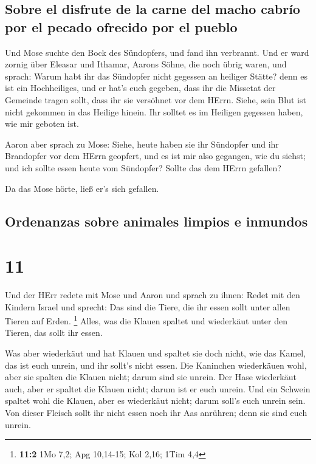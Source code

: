 \hypertarget{sobre-el-disfrute-de-la-carne-del-macho-cabruxedo-por-el-pecado-ofrecido-por-el-pueblo}{%
\subsection{Sobre el disfrute de la carne del macho cabrío por el pecado
ofrecido por el
pueblo}\label{sobre-el-disfrute-de-la-carne-del-macho-cabruxedo-por-el-pecado-ofrecido-por-el-pueblo}}

 Und Mose suchte den Bock des Sündopfers, und fand ihn
verbrannt. Und er ward zornig über Eleasar und Ithamar, Aarons Söhne,
die noch übrig waren, und sprach:  Warum habt ihr das
Sündopfer nicht gegessen an heiliger Stätte? denn es ist ein
Hochheiliges, und er hat's euch gegeben, dass ihr die Missetat der
Gemeinde tragen sollt, dass ihr sie versöhnet vor dem HErrn.
 Siehe, sein Blut ist nicht gekommen in das Heilige
hinein. Ihr solltet es im Heiligen gegessen haben, wie mir geboten ist.

 Aaron aber sprach zu Mose: Siehe, heute haben sie ihr
Sündopfer und ihr Brandopfer vor dem HErrn geopfert, und es ist mir also
gegangen, wie du siehst; und ich sollte essen heute vom Sündopfer?
Sollte das dem HErrn gefallen?

 Da das Mose hörte, ließ er's sich gefallen.

\hypertarget{ordenanzas-sobre-animales-limpios-e-inmundos}{%
\subsection{Ordenanzas sobre animales limpios e
inmundos}\label{ordenanzas-sobre-animales-limpios-e-inmundos}}

\hypertarget{section-10}{%
\section{11}\label{section-10}}

 Und der HErr redete mit Mose und Aaron und sprach zu
ihnen:  Redet mit den Kindern Israel und sprecht: Das sind
die Tiere, die ihr essen sollt unter allen Tieren auf Erden. \footnote{\textbf{11:2}
  1Mo 7,2; Apg 10,14-15; Kol 2,16; 1Tim 4,4}  Alles, was
die Klauen spaltet und wiederkäut unter den Tieren, das sollt ihr essen.

 Was aber wiederkäut und hat Klauen und spaltet sie doch
nicht, wie das Kamel, das ist euch unrein, und ihr sollt's nicht essen.
 Die Kaninchen wiederkäuen wohl, aber sie spalten die
Klauen nicht; darum sind sie unrein.  Der Hase wiederkäut
auch, aber er spaltet die Klauen nicht; darum ist er euch unrein.
 Und ein Schwein spaltet wohl die Klauen, aber es
wiederkäut nicht; darum soll's euch unrein sein.  Von
dieser Fleisch sollt ihr nicht essen noch ihr Aas anrühren; denn sie
sind euch unrein.

